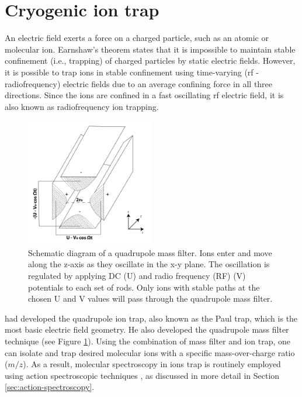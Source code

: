 \section{Cryogenic ion trap}

An electric field exerts a force on a charged particle, such as an atomic or molecular ion. Earnshaw's theorem states that it is impossible to maintain stable confinement (i.e., trapping) of charged particles by static electric fields. However, it is possible to trap ions in stable confinement using time-varying (rf - radiofrequency) electric fields due to an average confining force in all three directions. Since the ions are confined in a fast oscillating rf electric field, it is also known as radiofrequency ion trapping.

\begin{figure}[!htb]
    \centering
    \includegraphics[width=0.5\textwidth]{figures/intro/trap/Quadrupole.png}
    \caption{Schematic diagram of a quadrupole mass filter. Ions enter and move along the z-axis as they oscillate in the x-y plane. The oscillation is regulated by applying DC (U) and radio frequency (RF) (V) potentials to each set of rods. Only ions with stable paths at the chosen U and V values will pass through the quadrupole mass filter.}
    \label{fig:quadrupole}
\end{figure}

\citet{paul_ionenka_1955} had developed the quadrupole ion trap, also known as the Paul trap, which is the most basic electric field geometry. He also developed the quadrupole mass filter technique \cite{paul_elektrische_1955} (see Figure \ref{fig:quadrupole}). Using the combination of mass filter and ion trap, one can isolate and trap desired molecular ions with a specific mass-over-charge ratio ($m/z$). As a result, molecular spectroscopy in ions trap is routinely employed using action spectroscopic techniques \cite{SA2019, Roithovareview, Asvany2021}, as discussed in more detail in Section \ref{sec:action-spectroscopy}.

